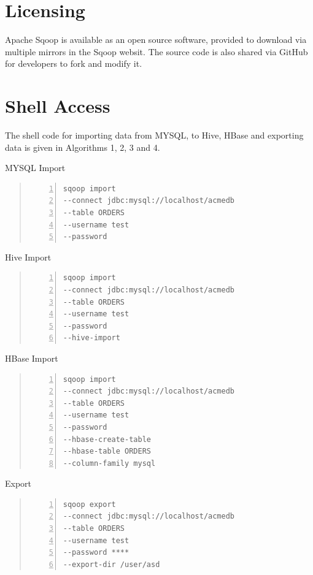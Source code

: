\documentclass[9pt,twocolumn,twoside]{styles/osajnl}
\begin{document}
\section{Licensing}
Apache Sqoop is available as an open source software, provided to download via multiple mirrors in the Sqoop websit\cite{down}. The source code is also shared via GitHub \cite{git} for developers to fork and modify it. 

\section{Shell Access}
The shell code for importing data from MYSQL, to Hive, HBase and exporting data is given in Algorithms 1, 2, 3 and 4\cite{cloudera}.

\begin{algorithm}
\caption{MYSQL Import}\label{alg:mysql}
\begin{quote}
\begin{Verbatim}[numbers=left]
sqoop import 
--connect jdbc:mysql://localhost/acmedb 
--table ORDERS 
--username test 
--password 
\end{Verbatim}
\end{quote}
\end{algorithm}
\begin{algorithm}
\caption{Hive Import}\label{alg:hive}
\begin{quote}
\begin{Verbatim}[numbers=left]
sqoop import 
--connect jdbc:mysql://localhost/acmedb 
--table ORDERS 
--username test 
--password
--hive-import
\end{Verbatim}
\end{quote}
\end{algorithm}
\begin{algorithm}
\caption{HBase Import}\label{alg:hbase}
\begin{quote}
\begin{Verbatim}[numbers=left]
sqoop import 
--connect jdbc:mysql://localhost/acmedb
--table ORDERS 
--username test 
--password 
--hbase-create-table 
--hbase-table ORDERS 
--column-family mysql
\end{Verbatim}
\end{quote}
\end{algorithm}

\begin{algorithm}
\caption{Export}\label{alg:export}
\begin{quote}
\begin{Verbatim}[numbers=left]
sqoop export
--connect jdbc:mysql://localhost/acmedb
--table ORDERS 
--username test 
--password **** 
--export-dir /user/asd
\end{Verbatim}
\end{quote}
\end{algorithm}
\end{document}
